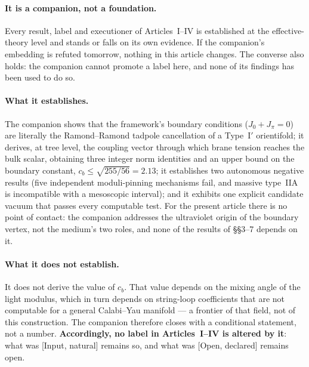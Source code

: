 \paragraph{It is a companion, not a foundation.} Every result, label and executioner of Articles~I--IV is established at the effective-theory level and stands or falls on its own evidence. If the companion's embedding is refuted tomorrow, nothing in this article changes. The converse also holds: the companion cannot promote a label here, and none of its findings has been used to do so.

\paragraph{What it establishes.} The companion shows that the framework's boundary conditions ($J_{0}+J_{\pi}=0$) are literally the Ramond--Ramond tadpole cancellation of a Type~I$'$ orientifold; it derives, at tree level, the coupling vector through which brane tension reaches the bulk scalar, obtaining three integer norm identities and an upper bound on the boundary constant, $c_{b}\leq\sqrt{255/56}=2.13$; it establishes two autonomous negative results (five independent moduli-pinning mechanisms fail, and massive type~IIA is incompatible with a mesoscopic interval); and it exhibits one explicit candidate vacuum that passes every computable test. For the present article there is no point of contact: the companion addresses the ultraviolet origin of the boundary vertex, not the medium's two roles, and none of the results of \S\S3--7 depends on it.

\paragraph{What it does not establish.} It does not derive the value of $c_{b}$. That value depends on the mixing angle of the light modulus, which in turn depends on string-loop coefficients that are not computable for a general Calabi--Yau manifold --- a frontier of that field, not of this construction. The companion therefore closes with a conditional statement, not a number. \textbf{Accordingly, no label in Articles~I--IV is altered by it}: what was [Input, natural] remains so, and what was [Open, declared] remains open.


